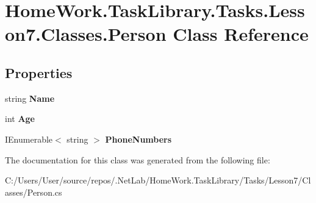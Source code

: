 \hypertarget{class_home_work_1_1_task_library_1_1_tasks_1_1_lesson7_1_1_classes_1_1_person}{}\section{Home\+Work.\+Task\+Library.\+Tasks.\+Lesson7.\+Classes.\+Person Class Reference}
\label{class_home_work_1_1_task_library_1_1_tasks_1_1_lesson7_1_1_classes_1_1_person}
\subsection*{Properties}
\begin{DoxyCompactItemize}
\item 
\mbox{\label{class_home_work_1_1_task_library_1_1_tasks_1_1_lesson7_1_1_classes_1_1_person_ab170136bef4dad060bc370123178237c}} 
string {\bfseries Name}
\item 
\mbox{\label{class_home_work_1_1_task_library_1_1_tasks_1_1_lesson7_1_1_classes_1_1_person_a02e7e3f97409fd20e8b8060ba07523cf}} 
int {\bfseries Age}
\item 
\mbox{\label{class_home_work_1_1_task_library_1_1_tasks_1_1_lesson7_1_1_classes_1_1_person_aa9cf90142a382f1a0983ed3120790287}} 
I\+Enumerable$<$ string $>$ {\bfseries Phone\+Numbers}
\end{DoxyCompactItemize}


The documentation for this class was generated from the following file\+:\begin{DoxyCompactItemize}
\item 
C\+:/\+Users/\+User/source/repos/.\+Net\+Lab/\+Home\+Work.\+Task\+Library/\+Tasks/\+Lesson7/\+Classes/Person.\+cs\end{DoxyCompactItemize}
